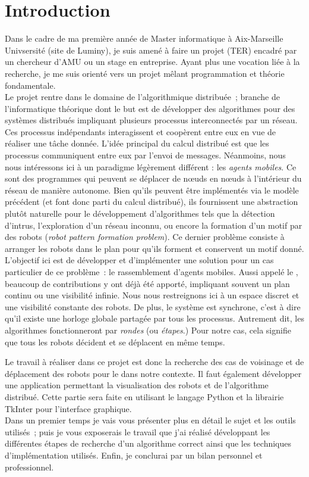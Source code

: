 \section*{Introduction}
Dans le cadre de ma première année de Master informatique à Aix-Marseille
Univsersité (site de Luminy), je suis amené à faire un projet (TER) encadré par
un chercheur d'AMU ou un stage en entreprise. Ayant plus une vocation liée à la
recherche, je me suis orienté vers un projet mêlant programmation et théorie
fondamentale. \\

Le projet rentre dans le domaine de l'algorithmique distribuée~; branche de
l'informatique théorique dont le but est de développer des algorithmes pour des
systèmes distribués impliquant plusieurs processus interconnectés par un
réseau. Ces processus indépendants interagissent et coopèrent entre eux en vue
de réaliser une tâche donnée.  L'idée principal du calcul distribué est que les
processus communiquent entre eux par l'envoi de messages. Néanmoins, nous nous
intéressons ici à un paradigme légèrement différent : les \textit{agents
mobiles}. Ce sont des programmes qui peuvent se déplacer de n\oe{}uds en
n\oe{}uds à l'intérieur du réseau de manière autonome. Bien qu'ils peuvent être
implémentés via le modèle précédent (et font donc parti du calcul distribué),
ils fournissent une abstraction plutôt naturelle pour le développement
d'algorithmes tels que la détection d'intrus, l'exploration d'un réseau
inconnu, ou encore la formation d'un motif par des robots (\textit{robot
pattern formation problem}). Ce dernier problème consiste à arranger les robots
dans le plan pour qu'ils forment et conservent un motif donné. \\

L'objectif ici est de développer et d'implémenter une solution pour un cas
particulier de ce problème~: le rassemblement d'agents mobiles. Aussi appelé le
\GatheringProblem, beaucoup de contributions y ont déjà été apporté, impliquant
souvent un plan continu ou une visibilité infinie. Nous nous restreignons ici à
un espace discret et une visibilité constante des robots. De plus, le système
est synchrone, c'est à dire qu'il existe une horloge globale partagée par tous
les processus. Autrement dit, les algorithmes fonctionneront par
\textit{rondes} (ou \textit{étapes}.) Pour notre cas, cela signifie que tous
les robots décident et se déplacent en même temps.

Le travail à réaliser dans ce projet est donc la recherche des cas de voisinage
et de déplacement des robots pour le \GatheringProblem dans notre contexte. Il
faut également développer une application permettant la visualisation des
robots et de l'algorithme distribué. Cette partie sera faite en utilisant le
langage Python et la librairie TkInter pour l'interface graphique. \\

Dans un premier temps je vais vous présenter plus en détail le sujet et les
outils utilisés~; puis je vous exposerais le travail que j'ai réalisé
développant les différentes étapes de recherche d'un algorithme correct ainsi
que les techniques d'implémentation utilisés. Enfin, je conclurai par un bilan
personnel et professionnel.
